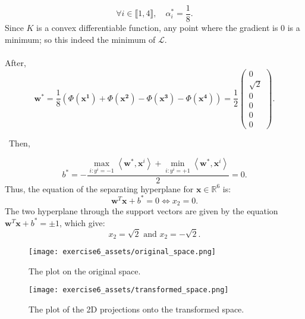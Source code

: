 \[
    \boxed{
    \forall i \in \llbracket 1 , 4 \rrbracket, \quad
    \alpha_i^* = \frac{1}{8}.
    }
\]
Since $K$ is a convex differentiable function, any point where the gradient is 0 is a minimum; so this indeed the minimum of $\mathcal{L}$.\\ \\
After,
\[
    \boxed{
    \mathbf{w^*} = \frac{1}{8}(\Phi(\mathbf{x^1}) + \Phi(\mathbf{x^2}) - \Phi(\mathbf{x^3}) - \Phi(\mathbf{x^4})) = \frac{1}{2}
    \begin{pmatrix}
        0 \\
        \sqrt{2} \\
        0 \\
        0 \\
        0 \\
        0
    \end{pmatrix}.
    }
\]

\bullet \ Then,

\[
    \boxed{
    b^*=-\frac{\max _{i: y^i=-1}\left\langle\mathbf{w}^*, \mathbf{x}^i\right\rangle+\min _{i: y^i=+1}\left\langle\mathbf{w}^*, \mathbf{x}^i\right\rangle}{2} = 0.
    }
\]
Thus, the equation of the separating hyperplane for $\mathbf{x} \in \mathbb{R}^6$ is:
\[
    \mathbf{w}^T\mathbf{x} + b^* = 0 \Longleftrightarrow \boxed{x_2 = 0.}
\]
The two hyperplane through the support vectors are given by the equation $\mathbf{w}^T\mathbf{x} + b^* = \pm 1$, which give:
\[
    \boxed{x_2 = \sqrt{2} \text{ and } x_2 = -\sqrt{2}.}
\]

\begin{figure}
    \centering
    \texttt{[image: exercise6\_assets/original\_space.png]}
    \caption{The plot on the original space.}
    \label{fig:original-space}
\end{figure}

\begin{figure}
    \centering
    \texttt{[image: exercise6\_assets/transformed\_space.png]}
    \caption{The plot of the 2D projections onto the transformed space.}
    \label{fig:transformed-space}
\end{figure}